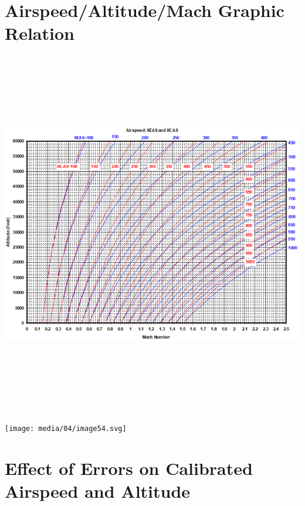 \documentclass[
]{book}
\begin{document}
\hypertarget{airspeedaltitudemach-graphic-relation}{%
\section{Airspeed/Altitude/Mach Graphic Relation}\label{airspeedaltitudemach-graphic-relation}}

\includegraphics[width=8.68611in,height=6.31181in]{media/04/image53.png}

\texttt{[image: media/04/image54.svg]}

\hypertarget{effect-of-errors-on-calibrated-airspeed-and-altitude}{%
\section{Effect of Errors on Calibrated Airspeed and Altitude}\label{effect-of-errors-on-calibrated-airspeed-and-altitude}}
\end{document}
